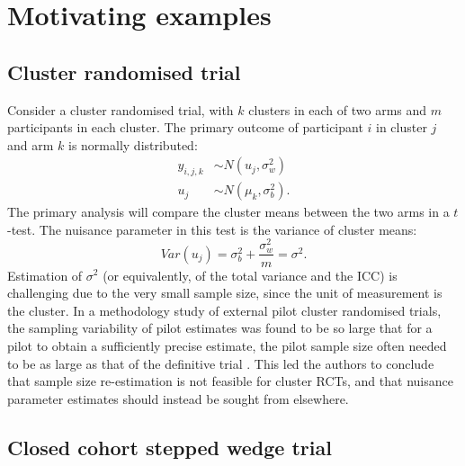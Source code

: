 \documentclass[sagev, Crown]{sagej}
\begin{document}
\section{Motivating examples}\label{sec:examples}



\subsection{Cluster randomised trial}\label{sec:ex_cRCT}

Consider a cluster randomised trial, with $k$ clusters in each of two arms and $m$ participants in each cluster. The primary outcome of participant $i$ in cluster $j$ and arm $k$ is normally distributed:
\begin{align*}
y_{i,j,k} & \sim N(u_j, \sigma_w^2) \\
u_j & \sim N(\mu_k, \sigma_b^2).
\end{align*}
The primary analysis will compare the cluster means between the two arms in a $t$-test. The nuisance parameter in this test is the variance of cluster means:
$$
Var(u_j) = \sigma_b^2 + \frac{\sigma_w^2}{m} = \sigma^2.
$$
Estimation of $\sigma^2$ (or equivalently, of the total variance and the ICC) is challenging due to the very small sample size, since the unit of measurement is the cluster. In a methodology study of external pilot cluster randomised trials, the sampling variability of pilot estimates was found to be so large that for a pilot to obtain a sufficiently precise estimate, the pilot sample size often needed to be as large as that of the definitive trial \cite{Eldridge2015}. This led the authors to conclude that sample size re-estimation is not feasible for cluster RCTs, and that nuisance parameter estimates should instead be sought from elsewhere.


\subsection{Closed cohort stepped wedge trial}\label{sec:ex_SW}
\end{document}
